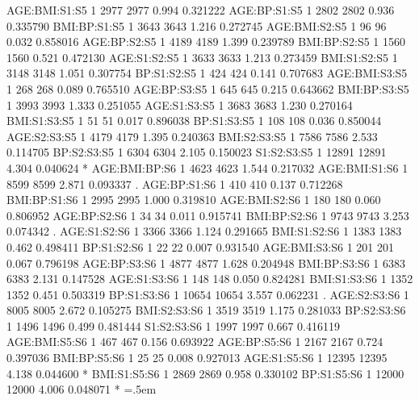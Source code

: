 \documentclass[runningheads]{llncs}
\newenvironment{lcverbatim}
 {\SaveVerbatim{cverb}}
 {\endSaveVerbatim
  \flushleft\fboxrule=0pt\fboxsep=.5em
  \colorbox{cverbbg}{%
    \makebox[\dimexpr\linewidth-2\fboxsep][l]{\BUseVerbatim{cverb}}%
  }
  \endflushleft
}
\begin{document}
\begin{lcverbatim}
AGE:BMI:S1:S5           1   2977    2977   0.994 0.321222    
AGE:BP:S1:S5            1   2802    2802   0.936 0.335790    
BMI:BP:S1:S5            1   3643    3643   1.216 0.272745    
AGE:BMI:S2:S5           1     96      96   0.032 0.858016    
AGE:BP:S2:S5            1   4189    4189   1.399 0.239789    
BMI:BP:S2:S5            1   1560    1560   0.521 0.472130    
AGE:S1:S2:S5            1   3633    3633   1.213 0.273459    
BMI:S1:S2:S5            1   3148    3148   1.051 0.307754    
BP:S1:S2:S5             1    424     424   0.141 0.707683    
AGE:BMI:S3:S5           1    268     268   0.089 0.765510    
AGE:BP:S3:S5            1    645     645   0.215 0.643662    
BMI:BP:S3:S5            1   3993    3993   1.333 0.251055    
AGE:S1:S3:S5            1   3683    3683   1.230 0.270164    
BMI:S1:S3:S5            1     51      51   0.017 0.896038    
BP:S1:S3:S5             1    108     108   0.036 0.850044    
AGE:S2:S3:S5            1   4179    4179   1.395 0.240363    
BMI:S2:S3:S5            1   7586    7586   2.533 0.114705    
BP:S2:S3:S5             1   6304    6304   2.105 0.150023    
S1:S2:S3:S5             1  12891   12891   4.304 0.040624 *  
AGE:BMI:BP:S6           1   4623    4623   1.544 0.217032    
AGE:BMI:S1:S6           1   8599    8599   2.871 0.093337 .  
AGE:BP:S1:S6            1    410     410   0.137 0.712268    
BMI:BP:S1:S6            1   2995    2995   1.000 0.319810    
AGE:BMI:S2:S6           1    180     180   0.060 0.806952    
AGE:BP:S2:S6            1     34      34   0.011 0.915741    
BMI:BP:S2:S6            1   9743    9743   3.253 0.074342 .  
AGE:S1:S2:S6            1   3366    3366   1.124 0.291665    
BMI:S1:S2:S6            1   1383    1383   0.462 0.498411    
BP:S1:S2:S6             1     22      22   0.007 0.931540    
AGE:BMI:S3:S6           1    201     201   0.067 0.796198    
AGE:BP:S3:S6            1   4877    4877   1.628 0.204948    
BMI:BP:S3:S6            1   6383    6383   2.131 0.147528    
AGE:S1:S3:S6            1    148     148   0.050 0.824281    
BMI:S1:S3:S6            1   1352    1352   0.451 0.503319    
BP:S1:S3:S6             1  10654   10654   3.557 0.062231 .  
AGE:S2:S3:S6            1   8005    8005   2.672 0.105275    
BMI:S2:S3:S6            1   3519    3519   1.175 0.281033    
BP:S2:S3:S6             1   1496    1496   0.499 0.481444    
S1:S2:S3:S6             1   1997    1997   0.667 0.416119    
AGE:BMI:S5:S6           1    467     467   0.156 0.693922    
AGE:BP:S5:S6            1   2167    2167   0.724 0.397036    
BMI:BP:S5:S6            1     25      25   0.008 0.927013    
AGE:S1:S5:S6            1  12395   12395   4.138 0.044600 *  
BMI:S1:S5:S6            1   2869    2869   0.958 0.330102    
BP:S1:S5:S6             1  12000   12000   4.006 0.048071 *  
\end{lcverbatim}
\end{document}
